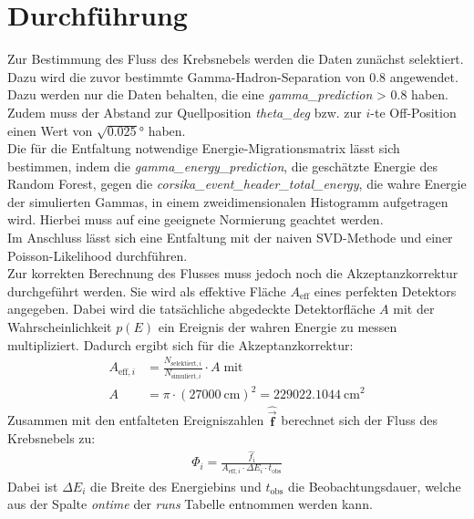 \section{Durchführung}
Zur Bestimmung des Fluss des Krebsnebels werden die Daten zunächst selektiert. Dazu wird die zuvor bestimmte Gamma-Hadron-Separation von $0.8$ angewendet. Dazu werden nur die Daten behalten, die eine \textit{gamma\_prediction} \textgreater \; $0.8$ haben. Zudem muss der Abstand zur Quellposition \textit{theta\_deg} bzw. zur $i$-te Off-Position einen Wert von $\sqrt{0.025}\si{\degree}$ haben.\\
Die für die Entfaltung notwendige Energie-Migrationsmatrix lässt sich bestimmen, indem die \textit{gamma\_energy\_prediction}, die geschätzte Energie des Random Forest, gegen die \textit{corsika\_event\_header\_total\_energy}, die wahre Energie der simulierten Gammas, in einem zweidimensionalen Histogramm aufgetragen wird. Hierbei muss auf eine geeignete Normierung geachtet werden.\\
Im Anschluss lässt sich eine Entfaltung mit der naiven SVD-Methode und einer Poisson-Likelihood durchführen.\\
Zur korrekten Berechnung des Flusses muss jedoch noch die Akzeptanzkorrektur durchgeführt werden. Sie wird als effektive Fläche $A_{\text{eff}}$ eines perfekten Detektors angegeben. Dabei wird die tatsächliche abgedeckte Detektorfläche $A$ mit der Wahrscheinlichkeit $p(E)$ ein Ereignis der wahren Energie zu messen multipliziert. Dadurch ergibt sich für die Akzeptanzkorrektur:\\
\begin{align}
	A_{\text{eff},i} &= \frac{N_{\text{selektiert},i}}{N_{\text{simuliert},i}} \cdot A \; \text{mit}\\
	A &= \pi \cdot (\SI{27000}{\centi\meter})^2 = \SI{229022.1044}{\centi\meter}^2
	\label{eqn:Aeff}
\end{align}
Zusammen mit den entfalteten Ereigniszahlen $\hat{\vec{\pmb{f}}}$ berechnet sich der Fluss des Krebsnebels zu:
\begin{align}
	\Phi_{i} = \frac{\hat{f_\mathrm{i}}}{A_{\text{eff},i} \cdot \Delta E_{i} \cdot t_{\text{obs}}}
	\label{eqn:phi}
\end{align}
Dabei ist $\Delta E_{i}$ die Breite des Energiebins und $t_{\text{obs}}$ die Beobachtungsdauer, welche aus der Spalte \textit{ontime} der \textit{runs} Tabelle entnommen werden kann.
